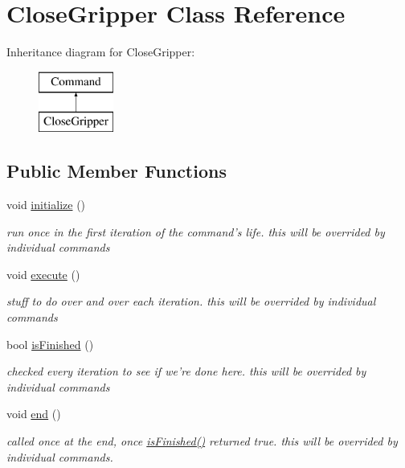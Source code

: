 \hypertarget{classCloseGripper}{\section{Close\-Gripper Class Reference}
\label{classCloseGripper}
}
Inheritance diagram for Close\-Gripper\-:\begin{figure}[H]
\begin{center}
\leavevmode
\includegraphics[height=2.000000cm]{classCloseGripper}
\end{center}
\end{figure}
\subsection*{Public Member Functions}
\begin{DoxyCompactItemize}
\item 
\hypertarget{classCloseGripper_a91b194b7afe5bdc70ccb97fb6a77e956}{void \hyperlink{classCloseGripper_a91b194b7afe5bdc70ccb97fb6a77e956}{initialize} ()}\label{classCloseGripper_a91b194b7afe5bdc70ccb97fb6a77e956}

\begin{DoxyCompactList}\small\item\em run once in the first iteration of the command's life. this will be overrided by individual commands \end{DoxyCompactList}\item 
\hypertarget{classCloseGripper_a11b489ca1de2f1be5cb82f47345360d8}{void \hyperlink{classCloseGripper_a11b489ca1de2f1be5cb82f47345360d8}{execute} ()}\label{classCloseGripper_a11b489ca1de2f1be5cb82f47345360d8}

\begin{DoxyCompactList}\small\item\em stuff to do over and over each iteration. this will be overrided by individual commands \end{DoxyCompactList}\item 
bool \hyperlink{classCloseGripper_afab2b93b62904d6fd70a794a9f954abf}{is\-Finished} ()
\begin{DoxyCompactList}\small\item\em checked every iteration to see if we're done here. this will be overrided by individual commands \end{DoxyCompactList}\item 
\hypertarget{classCloseGripper_a06ab30ca6e30278ab74e973e268c5d97}{void \hyperlink{classCloseGripper_a06ab30ca6e30278ab74e973e268c5d97}{end} ()}\label{classCloseGripper_a06ab30ca6e30278ab74e973e268c5d97}

\begin{DoxyCompactList}\small\item\em called once at the end, once \hyperlink{classCloseGripper_afab2b93b62904d6fd70a794a9f954abf}{is\-Finished()} returned true. this will be overrided by individual commands. \end{DoxyCompactList}\end{DoxyCompactItemize}
